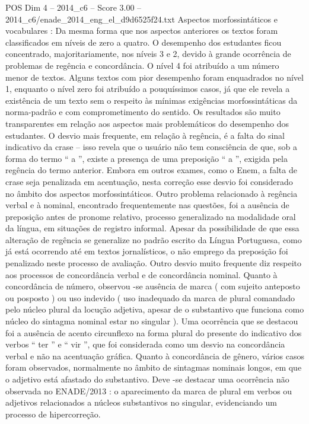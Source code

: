 \begin{textsample}{POS Dim 4 – 2014\_c6 – Score 3.00 – 2014\_c6/enade\_2014\_eng\_el\_d9d6525f24.txt}
Aspectos morfossintáticos e vocabulares : Da mesma forma que nos aspectos anteriores os textos foram classificados em níveis de zero a quatro.
O desempenho dos estudantes ficou concentrado, majoritariamente, nos níveis 3 e 2, devido à grande ocorrência de problemas de regência e concordância.
O nível 4 foi atribuído a um número menor de textos.
Alguns textos com pior desempenho foram enquadrados no nível 1, enquanto o nível zero foi atribuído a pouquíssimos casos, já que ele revela a existência de um texto sem o respeito às mínimas exigências morfossintáticas da norma-padrão e com comprometimento do sentido.
Os resultados são muito transparentes em relação aos aspectos mais problemáticos do desempenho dos estudantes.
O desvio mais frequente, em relação à regência, é a falta do sinal indicativo da crase – isso revela que o usuário não tem consciência de que, sob a forma do termo “ a ”, existe a presença de uma preposição “ a ”, exigida pela regência do termo anterior.
Embora em outros exames, como o Enem, a falta de crase seja penalizada em acentuação, nesta correção esse desvio foi considerado no âmbito dos aspectos morfossintáticos.
Outro problema relacionado à regência verbal e à nominal, encontrado frequentemente nas questões, foi a ausência de preposição antes de pronome relativo, processo generalizado na modalidade oral da língua, em situações de registro informal.
Apesar da possibilidade de que essa alteração de regência se generalize no padrão escrito da Língua Portuguesa, como já está ocorrendo até em textos jornalísticos, o não emprego da preposição foi penalizado neste processo de avaliação.
Outro desvio muito frequente diz respeito aos processos de concordância verbal e de concordância nominal.
Quanto à concordância de número, observou -se ausência de marca ( com sujeito anteposto ou posposto ) ou uso indevido ( uso inadequado da marca de plural comandado pelo núcleo plural da locução adjetiva, apesar de o substantivo que funciona como núcleo do sintagma nominal estar no singular ).
Uma ocorrência que se destacou foi a ausência de acento circunflexo na forma plural do presente do indicativo dos verbos “ ter ” e “ vir ”, que foi considerada como um desvio na concordância verbal e não na acentuação gráfica.
Quanto à concordância de gênero, vários casos foram observados, normalmente no âmbito de sintagmas nominais longos, em que o adjetivo está afastado do substantivo.
Deve -se destacar uma ocorrência não observada no ENADE/2013 : o aparecimento da marca de plural em verbos ou adjetivos relacionados a núcleos substantivos no singular, evidenciando um processo de hipercorreção.

\end{textsample}
